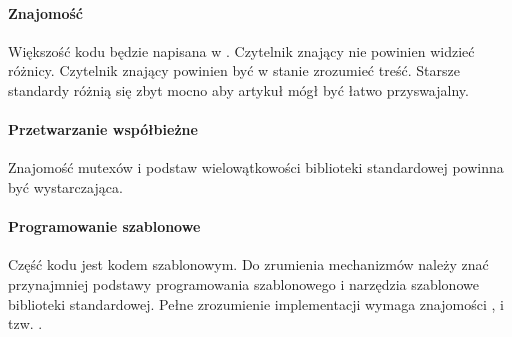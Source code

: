 \paragraph{Znajomość }
Większość kodu będzie napisana w . Czytelnik znający  nie powinien widzieć różnicy. Czytelnik znający  powinien być w stanie zrozumieć treść. Starsze standardy różnią się zbyt mocno aby artykuł mógł być łatwo przyswajalny.

\paragraph{Przetwarzanie współbieżne}
Znajomość mutexów i podstaw wielowątkowości biblioteki standardowej \Cpp{} powinna być wystarczająca.

\paragraph{Programowanie szablonowe}
Część kodu jest kodem szablonowym. Do zrumienia mechanizmów należy znać przynajmniej podstawy programowania szablonowego i narzędzia szablonowe biblioteki standardowej. Pełne zrozumienie implementacji wymaga znajomości , i tzw. .
